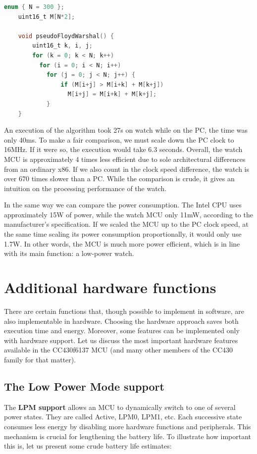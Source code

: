 \begin{lstlisting}[numbers=none, keywordstyle=\bfseries, language=C]
    enum { N = 300 };
    uint16_t M[N*2];

    void pseudoFloydWarshal() {
        uint16_t k, i, j;
        for (k = 0; k < N; k++)
          for (i = 0; i < N; i++)
            for (j = 0; j < N; j++) {
                if (M[i+j] > M[i+k] + M[k+j])
                  M[i+j] = M[i+k] + M[k+j];
            }
    }
\end{lstlisting}

An execution of the algorithm took 27s on watch while on the PC, the
time was only 40ms.  To make a fair comparison, we must scale down the
PC clock to 16MHz. If it were so, the execution would take 6.3
seconds. Overall, the watch MCU is approximately 4 times less
efficient due to sole architectural differences from an ordinary x86.
If we also count in the clock speed difference, the watch is over 670
times slower than a PC. While the comparison is crude, it gives an
intuition on the processing performance of the watch.

In the same way we can compare the power consumption.  The Intel CPU uses
approximately 15W of power, while the watch MCU only 11mW, according to
the manufacturer's \cite{CC430F6137ds} specification. If we
scaled the MCU up to the PC clock speed, at the same time scaling its
power consumption proportionally, it would only use 1.7W. In
other words, the MCU is much more power efficient, which is in line
with its main function: a low-power watch.

\section{Additional hardware functions}
\label{ch:hardware_functions}

There are certain functions that, though possible to implement in
software, are also implementable in hardware. Choosing the
hardware approach saves both execution time and energy. Moreover, some
features can be implemented only with hardware support. Let us discuss
the most important hardware features available in the CC430f6137 MCU
(and many other members of the CC430 family for that matter).

\subsection{The Low Power Mode support}
The {\bf LPM support} allows an MCU to dynamically switch to
one of several power states.  They are called Active, LPM0, LPM1, etc.
Each successive state consumes less energy by disabling more hardware
functions and peripherals. This mechanism is crucial for lengthening
the battery life. To illustrate how important this is, let us present
some crude battery life estimates:

